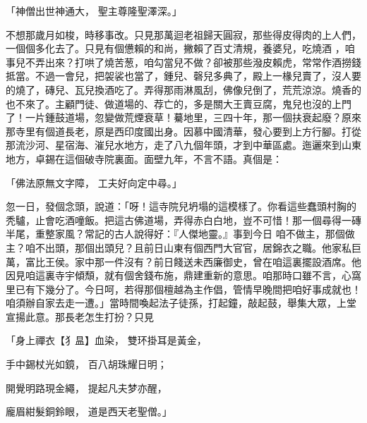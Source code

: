 「神僧出世神通大，  聖主尊隆聖澤深。」

不想那歲月如梭，時移事改。只見那萬迴老祖歸天圓寂，那些得皮得肉的上人們，一個個多化去了。只見有個憊賴的和尚，撇賴了百丈清規，養婆兒，吃燒酒 ，咱事兒不弄出來？打哄了燒苦葱，咱勾當兒不做？卻被那些潑皮賴虎，常常作酒撈錢抵當。不過一會兒，把袈裟也當了，鍾兒、磬兒多典了，殿上一椽兒賣了，沒人要的燒了，磚兒、瓦兒換酒吃了。弄得那雨淋風刮，佛像兒倒了，荒荒涼涼。燒香的也不來了。主顧門徒、做道場的、荐亡的，多是關大王賣豆腐，鬼兒也沒的上門了！一片鍾鼓道場，忽變做荒煙衰草！驀地里，三四十年，那一個扶衰起廢？原來那寺里有個道長老，原是西印度國出身。因慕中國清華，發心要到上方行腳。打從那流沙河、星宿海、漼兒水地方，走了八九個年頭，才到中華區處。迤邐來到山東地方，卓錫在這個破寺院裏面。面壁九年，不言不語。真個是：

「佛法原無文字障，  工夫好向定中尋。」

忽一日，發個念頭，說道：「呀！這寺院兒坍塌的這模樣了。你看這些蠢頭村胸的秃驢，止會吃酒噇飯。把這古佛道場，弄得赤白白地，豈不可惜！那一個尋得一磚半尾，重整家風？常記的古人說得好：『人傑地靈。』事到今日 咱不做主，那個做主？咱不出頭，那個出頭兒？且前日山東有個西門大官官，居錦衣之職。他家私巨萬，富比王侯。家中那一件沒有？前日餞送未西廉御史，曾在咱這裏擺設酒席。他因見咱這裏寺宇傾頹，就有個舍錢布施，鼎建重新的意思。咱那時口雖不言，心窩里已有下幾分了。今日呵，若得那個檀越為主作倡，管情早晚間把咱好事成就也！咱須辦自家去走一遭。」當時間喚起法子徒孫，打起鐘，敲起鼓，舉集大眾，上堂宣揚此意。那長老怎生打扮？只見

「身上禪衣【犭昷】血染，  雙环掛耳是黃金，

手中錫杖光如鏡，  百八胡珠耀日明；

開覺明路現金繩，  提起凡夫梦亦醒，

龐眉紺髮銅鈴眼，  道是西天老聖僧。」

